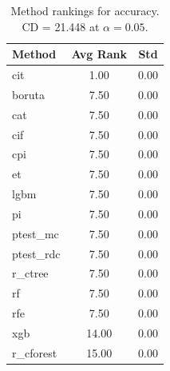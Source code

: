 \begin{table}[h]
\centering
\caption{Method rankings for accuracy. CD = 21.448 at $\alpha=0.05$.}
\label{tab:ranks_accuracy}
\begin{tabular}{lcc}
\toprule
Method & Avg Rank & Std \\
\midrule
cit & 1.00 & 0.00 \\
boruta & 7.50 & 0.00 \\
cat & 7.50 & 0.00 \\
cif & 7.50 & 0.00 \\
cpi & 7.50 & 0.00 \\
et & 7.50 & 0.00 \\
lgbm & 7.50 & 0.00 \\
pi & 7.50 & 0.00 \\
ptest_mc & 7.50 & 0.00 \\
ptest_rdc & 7.50 & 0.00 \\
r_ctree & 7.50 & 0.00 \\
rf & 7.50 & 0.00 \\
rfe & 7.50 & 0.00 \\
xgb & 14.00 & 0.00 \\
r_cforest & 15.00 & 0.00 \\
\bottomrule
\end{tabular}
\end{table}